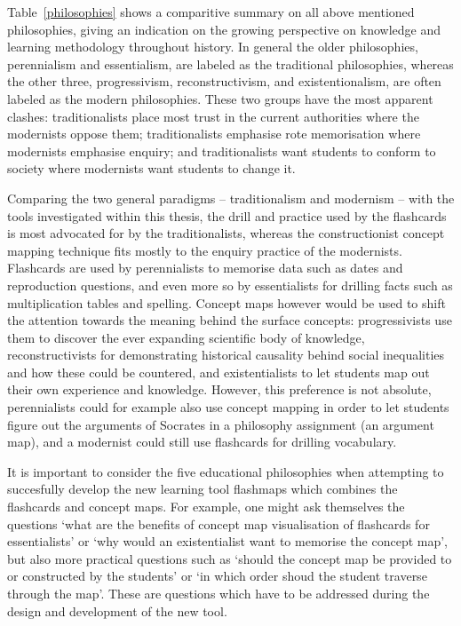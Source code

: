 Table~\ref{philosophies} shows a comparitive summary on all above mentioned philosophies, giving an indication on the growing perspective on knowledge and learning methodology throughout history. In general the older philosophies, perennialism and essentialism, are labeled as the traditional philosophies, whereas the other three, progressivism, reconstructivism, and existentionalism, are often labeled as the modern philosophies. These two groups have the most apparent clashes: traditionalists place most trust in the current authorities where the modernists oppose them; traditionalists emphasise rote memorisation where modernists emphasise enquiry; and traditionalists want students to conform to society where modernists want students to change it.

Comparing the two general paradigms -- traditionalism and modernism -- with the tools investigated within this thesis, the drill and practice used by the flashcards is most advocated for by the traditionalists, whereas the constructionist concept mapping technique fits mostly to the enquiry practice of the modernists. Flashcards are used by perennialists to memorise data such as dates and reproduction questions, and even more so by essentialists for drilling facts such as multiplication tables and spelling. Concept maps however would be used to shift the attention towards the meaning behind the surface concepts: progressivists use them to discover the ever expanding scientific body of knowledge, reconstructivists for demonstrating historical causality behind social inequalities and how these could be countered, and existentialists to let students map out their own experience and knowledge. However, this preference is not absolute, perennialists could for example also use concept mapping in order to let students figure out the arguments of Socrates in a philosophy assignment (an argument map), and a modernist could still use flashcards for drilling vocabulary.

It is important to consider the five educational philosophies when attempting to succesfully develop the new learning tool flashmaps which combines the flashcards and concept maps. For example, one might ask themselves the questions `what are the benefits of concept map visualisation of flashcards for essentialists' or `why would an existentialist want to memorise the concept map', but also more practical questions such as `should the concept map be provided to or constructed by the students' or `in which order shoud the student traverse through the map'. These are questions which have to be addressed during the design and development of the new tool.
